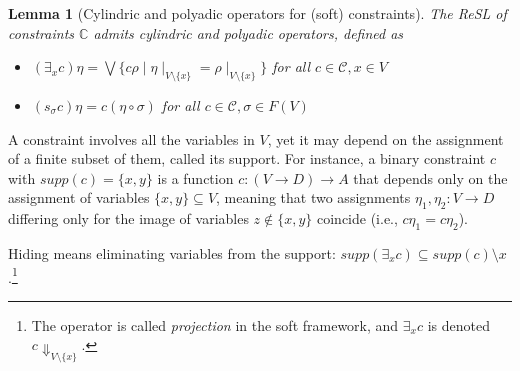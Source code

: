 \documentclass[preprint,12pt]{elsarticle}
\newtheorem{lemma}{Lemma}
\begin{document}
{	\begin{lemma}[Cylindric and polyadic operators for (soft) constraints]
		The ReSL of constraints $\mathbb{C}$ admits cylindric and polyadic operators, defined as
		\begin{itemize}
			\item  $(\exists_x c) \eta = \bigvee \{c \rho \mid \eta\mid_{V \setminus \{x\}} = 
			\rho\mid_{V \setminus \{x\}}\}$ for all $c \in {\mathcal C}, x \in V$
			\item  $(s_\sigma c) \eta = c (\eta \circ \sigma)$ for all $c \in {\mathcal C}, \sigma \in F(V)$	
		\end{itemize}
	\end{lemma}
	
	
	A constraint involves all the variables in $V$, yet it may depend on
	the assignment of a finite subset of them, called its support. For
	instance, a binary constraint $c$ with $supp(c)=\{x,y\}$ is a function
	$c: (V\rightarrow D)\rightarrow A$ that depends only on the
	assignment of variables $\{x,y\}\subseteq V$, meaning that two
	assignments $\eta_1, \eta_2: V \rightarrow D$ differing only for the
	image of variables $z \not \in \{x,y\}$ coincide (i.e., $c\eta_1 =
	c\eta_2$).
	
	
	Hiding means eliminating variables from the support:
	$supp(\exists_x c) \subseteq supp({c}) \setminus {x}$.\footnote{The operator
		is called \emph{projection} in the soft framework,
		and $\exists_x c$ is denoted $c\Downarrow_{V\setminus \{x\}}$.}
}
\end{document}
